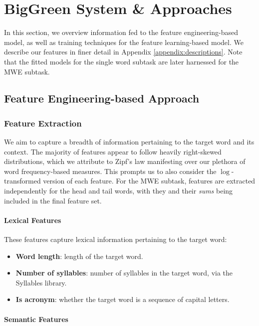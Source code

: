 \documentclass{dcthesis}
\theoremstyle{definition}
\theoremstyle{remark}
\begin{document}
\chapter{BigGreen System \& Approaches}

In this section, we overview information fed to the feature engineering-based model, as well as training techniques for the feature learning-based model. We describe our features in finer detail in Appendix \ref{appendix:descriptions}. Note that the fitted models for the single word subtask are later harnessed for the MWE subtask.

\section{Feature Engineering-based Approach}

\subsection{Feature Extraction}

We aim to capture a breadth of information pertaining to the target word and its context. The majority of features appear to follow heavily right-skewed distributions, which we attribute to Zipf's law manifesting over our plethora of word frequency-based measures. This prompts us to also consider the $\log$-transformed version of each feature. For the MWE subtask, features are extracted independently for the head and tail words, with they and their \textit{sums} being included in the final feature set.

\subsubsection{Lexical Features}

These features capture lexical information pertaining to the target word:

\begin{itemize}
  \item \textbf{Word length}: length of the target word.
  \item \textbf{Number of syllables}: number of syllables in the target word, via the Syllables library.
  \item \textbf{Is acronym}: whether the target word is a sequence of capital letters.
\end{itemize}
  
\subsubsection{Semantic Features}
\end{document}
